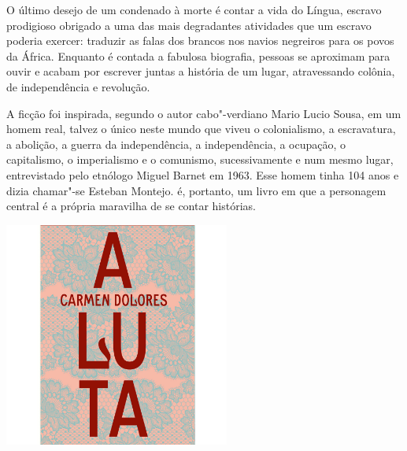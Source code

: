 \hspace*{-7cm}\hrulefill\hspace*{-7cm}

\medskip

\noindent{}O último desejo de um condenado à morte é contar a vida do Língua, escravo prodigioso obrigado a uma das mais degradantes atividades que um escravo poderia exercer: traduzir as falas dos brancos nos navios negreiros para os povos da África. Enquanto é contada a fabulosa biografia, pessoas se aproximam para ouvir e acabam por escrever juntas a história de um lugar, atravessando colônia, de independência e revolução.

A ficção foi inspirada, segundo o autor cabo"-verdiano Mario Lucio Sousa, em um homem real, talvez o único neste mundo que viveu o colonialismo, a escravatura, a abolição, a guerra da independência, a independência, a ocupação, o capitalismo, o imperialismo e o comunismo, sucessivamente e num mesmo lugar, entrevistado pelo etnólogo Miguel Barnet em 1963. Esse homem tinha 104 anos e dizia chamar"-se Esteban Montejo. {} é, portanto, um livro em que a personagem central é a própria maravilha de se contar histórias.

\vfill

\hspace*{-.4cm}\begin{minipage}[c]{.5\linewidth}
\small{
{}}
\end{minipage}

\pagebreak %


\begin{center}
\hspace*{-3.6cm}
\hspace*{3.1cm}\includegraphics[width=74mm]{./grid/luta.jpg}
\end{center}

